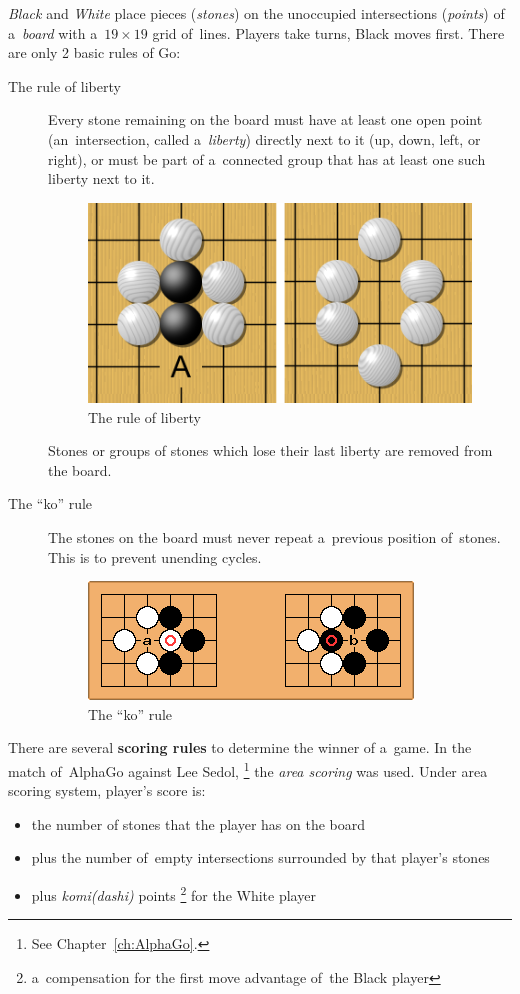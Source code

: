 \emph{Black} and \emph{White} place pieces (\emph{stones}) on the unoccupied intersections (\emph{points}) of a~\emph{board} with a~$19\times19$ grid of~lines.
Players take turns, Black moves first.
There are only 2 basic rules of Go:
\begin{description}
  \item [The rule of liberty]
    Every stone remaining on the board must have at least one open point (an~intersection, called a~\emph{liberty}) directly next to it (up, down, left, or right), or must be part of a~connected group that has at least one such liberty next to it.
    \begin{figure}[H]
      \centering
      \includegraphics[width=.5\textwidth]{../img/Go_rule_of_liberty.png}
      \caption{The rule of liberty}
      \label{fig:Go-rule-liberty}
    \end{figure}

    Stones or groups of stones which lose their last liberty are removed from the board.

  \item [The ``ko'' rule]
    The stones on the board must never repeat a~previous position of~stones.
    This is to prevent unending cycles.
    \begin{figure}[H]
      \centering
      \includegraphics[width=.5\textwidth]{../img/Go_ko_rule.png}
      \caption{The ``ko'' rule}
      \label{fig:Go-Ko-rule}
    \end{figure}
\end{description}

There are several \textbf{scoring rules} to determine the winner of a~game.
In the match of~AlphaGo against Lee Sedol,%
\footnote{See Chapter~\ref{ch:AlphaGo}.}
the \emph{area scoring} was used.
Under area scoring system, player's score is:
\begin{itemize}
  \item the number of stones that the player has on the board
  \item plus the number of~empty intersections surrounded by that player's stones
  \item plus \emph{komi(dashi)} points%
    \footnote{a~compensation for the first move advantage of~the Black player}
    for the White player
\end{itemize}


